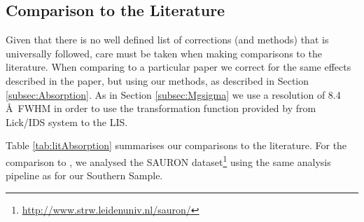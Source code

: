 \documentclass[a4paper,fleqn,usenatbib]{mnras}
\begin{document}
	\subsection{Comparison to the Literature}
		\label{subsec:Lit}
		Given that there is no well defined list of corrections (and methods) that is universally followed, care must be taken when making comparisons to the literature. When comparing to a particular paper we correct for the same effects described in the paper, but using our methods, as described in Section \ref{subsec:Absorption}. As in Section \ref{subsec:Mgsigma} we use a resolution of 8.4\,\AA\ FWHM in order to use the transformation function provided by \citet{Vazdekis2010} from Lick/IDS system to the LIS.

		Table \ref{tab:litAbsorption} summarises our comparisons to the literature. For the comparison to \citet{Vazdekis2010}, we analysed the SAURON dataset\footnote{\url{http://www.strw.leidenuniv.nl/sauron/}} \citep{Emsellem2004} using the same analysis pipeline as for our Southern Sample. 
\end{document}
